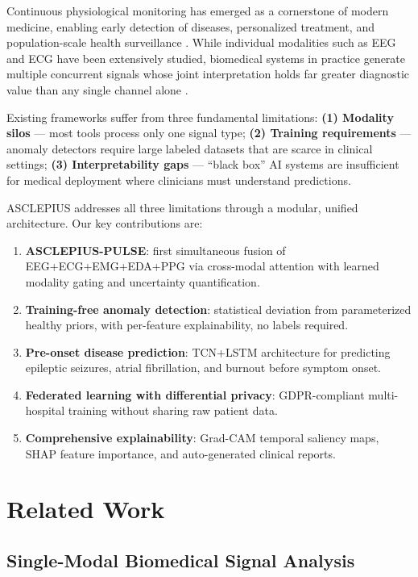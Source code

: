 \documentclass[journal]{IEEEtran}
\begin{document}
Continuous physiological monitoring has emerged as a cornerstone of modern
medicine, enabling early detection of diseases, personalized treatment, and
population-scale health surveillance \cite{rajpurkar2022ai}. While individual
modalities such as EEG and ECG have been extensively studied, biomedical
systems in practice generate multiple concurrent signals whose joint
interpretation holds far greater diagnostic value than any single channel
alone \cite{steyaert2023multimodal}.

Existing frameworks suffer from three fundamental limitations:
\textbf{(1) Modality silos} — most tools process only one signal type;
\textbf{(2) Training requirements} — anomaly detectors require large labeled
datasets that are scarce in clinical settings;
\textbf{(3) Interpretability gaps} — ``black box'' AI systems are insufficient
for medical deployment where clinicians must understand predictions.

ASCLEPIUS addresses all three limitations through a modular, unified
architecture. Our key contributions are:
\begin{enumerate}
  \item \textbf{ASCLEPIUS-PULSE}: first simultaneous fusion of
        EEG+ECG+EMG+EDA+PPG via cross-modal attention with learned modality
        gating and uncertainty quantification.
  \item \textbf{Training-free anomaly detection}: statistical deviation from
        parameterized healthy priors, with per-feature explainability, no
        labels required.
  \item \textbf{Pre-onset disease prediction}: TCN+LSTM architecture for
        predicting epileptic seizures, atrial fibrillation, and burnout
        before symptom onset.
  \item \textbf{Federated learning with differential privacy}: GDPR-compliant
        multi-hospital training without sharing raw patient data.
  \item \textbf{Comprehensive explainability}: Grad-CAM temporal saliency maps,
        SHAP feature importance, and auto-generated clinical reports.
\end{enumerate}

\section{Related Work}
\label{sec:related}

\subsection{Single-Modal Biomedical Signal Analysis}
\end{document}
